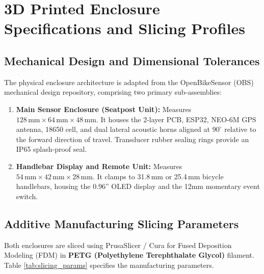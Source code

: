 \clearpage
\chapter{3D Printed Enclosure Specifications and Slicing Profiles}
\label{app:enclosure}

\section{Mechanical Design and Dimensional Tolerances}
The physical enclosure architecture is adapted from the OpenBikeSensor (OBS) mechanical design repository, comprising two primary sub-assemblies:
\begin{enumerate}
    \item \textbf{Main Sensor Enclosure (Seatpost Unit):} Measures $128\,\text{mm} \times 64\,\text{mm} \times 48\,\text{mm}$. It houses the 2-layer PCB, ESP32, NEO-6M GPS antenna, 18650 cell, and dual lateral acoustic horns aligned at $90^\circ$ relative to the forward direction of travel. Transducer rubber sealing rings provide an IP65 splash-proof seal.
    \item \textbf{Handlebar Display and Remote Unit:} Measures $54\,\text{mm} \times 42\,\text{mm} \times 28\,\text{mm}$. It clamps to 31.8\,mm or 25.4\,mm bicycle handlebars, housing the 0.96'' OLED display and the 12mm momentary event switch.
\end{enumerate}

\section{Additive Manufacturing Slicing Parameters}
Both enclosures are sliced using PrusaSlicer / Cura for Fused Deposition Modeling (FDM) in \textbf{PETG (Polyethylene Terephthalate Glycol)} filament. Table \ref{tab:slicing_params} specifies the manufacturing parameters.

